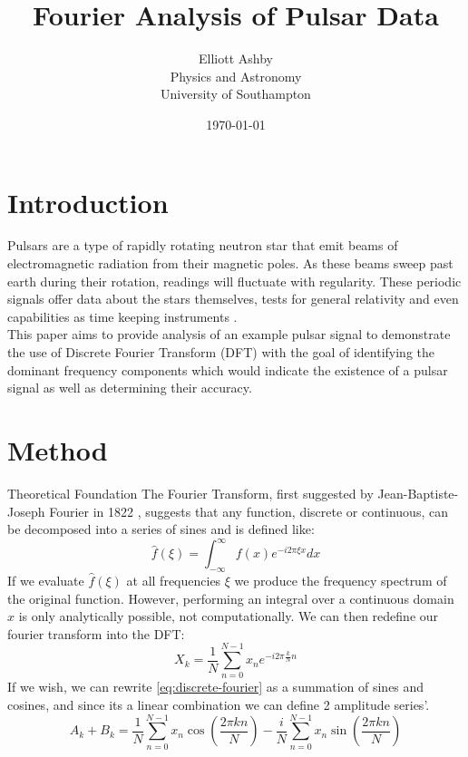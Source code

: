 \documentclass[reqno]{amsart}
\title{Fourier Analysis of Pulsar Data}
\author[Elliott Ashby]{Elliott Ashby \\ Physics and Astronomy \\ University of Southampton}
\date{\monthyeardate\today}
\makeatletter
\renewcommand\subsection{\@startsection{subsection}{2}%
  \z@{.5\linespacing\@plus.7\linespacing}{-.5em}%
  {\normalfont\scshape\justify}}
\numberwithin{equation}{section}
\numberwithin{figure}{section}
\makeatother
\begin{document}
\begin{abstract}
\end{abstract}
\vspace*{-2cm}
\maketitle
\tableofcontents
\newpage
\section{Introduction}
Pulsars are a type of rapidly rotating neutron star that emit beams of electromagnetic radiation from their magnetic poles. As these beams sweep past earth during their rotation, readings will fluctuate with regularity. These periodic signals offer data about the stars themselves, tests for general relativity \cite{Taylor1981} and even capabilities as time keeping instruments \cite{Backer1984}. \\

This paper aims to provide analysis of an example pulsar signal to demonstrate the use of Discrete Fourier Transform (DFT) with the goal of identifying the dominant frequency components which would indicate the existence of a pulsar signal as well as determining their accuracy.
\section{Method}
\subsection{Theoretical Foundation}
The Fourier Transform, first suggested by Jean-Baptiste-Joseph Fourier in 1822 \cite{Fourier1822}, suggests that any function, discrete or continuous, can be decomposed into a series of sines and is defined like:
\begin{equation}
    \hat{f}(\xi) = \int_{-\infty}^{\infty} f(x) e^{-i2\pi\xi x} dx
    \label{eq:continuous-fourier}
\end{equation}
If we evaluate $\hat{f}(\xi)$ at all frequencies $\xi$ we produce the frequency spectrum of the original function. However, performing an integral over a continuous domain $x$ is only analytically possible, not computationally. We can then redefine our fourier transform into the DFT:
\begin{equation}
    X_k = \frac{1}{N}\sum_{n=0}^{N-1} x_n e^{-i2\pi \frac{k}{N} n}
    \label{eq:discrete-fourier}
\end{equation}
If we wish, we can rewrite \ref{eq:discrete-fourier} as a summation of sines and cosines, and since its a linear combination we can define 2 amplitude series'.
\begin{equation}
    A_k + B_k = \frac{1}{N}\sum_{n=0}^{N-1} x_n \cos\left(\frac{2\pi k n}{N}\right) - \frac{i}{N} \sum_{n=0}^{N-1} x_n \sin\left(\frac{2\pi k n}{N}\right)
    \label{eq:discrete-fourier-sines-cosines}
\end{equation}
\end{document}
